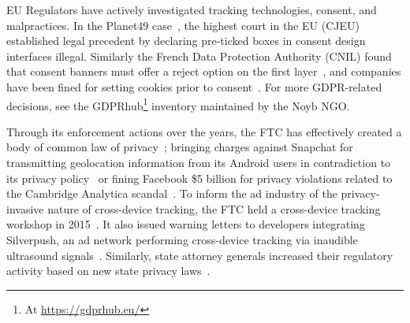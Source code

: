 EU Regulators have actively investigated tracking technologies, consent, and malpractices.
%
In the Planet49 case~\cite{bouhoulaAutomatedLargeScaleAnalysis2024}, the highest court in the EU (CJEU) established legal precedent by declaring pre-ticked boxes in consent design interfaces illegal. Similarly the French Data Protection Authority (CNIL) found that consent banners must offer a reject option on the first layer~\cite{bielovaEffectDesignPatterns2024},
and companies have been fined for setting cookies prior to consent~\cite{sunGDPRxivEstablishingState2023,marjanovDataSecurityGround2023}.
For more GDPR-related decisions, see the GDPRhub\footnote{At \url{https://gdprhub.eu/}} inventory maintained by the Noyb NGO.

 Through its enforcement actions over the years, the FTC has effectively created a body of common law of privacy~\cite{soloveFTCNewCommon2013}; bringing charges against Snapchat for transmitting geolocation information from its Android users in contradiction to its privacy policy~\cite{ftcSnapchatSettlesFTC2014} or fining Facebook \$5 billion for privacy violations related to the Cambridge Analytica scandal~\cite{FTCImposes52019}.
%
To inform the ad industry of the privacy-invasive nature of cross-device tracking, the FTC held a cross-device tracking workshop in 2015~\cite{ftcCrossDeviceTracking2015}. It also issued warning letters to developers integrating Silverpush, an ad network performing cross-device tracking via inaudible ultrasound signals~\cite{ftcFTCIssuesWarning2016}.
%
Similarly, state attorney generals increased their regulatory activity based on new state privacy laws~\cite{azizJohnnyStillCant2024}.


